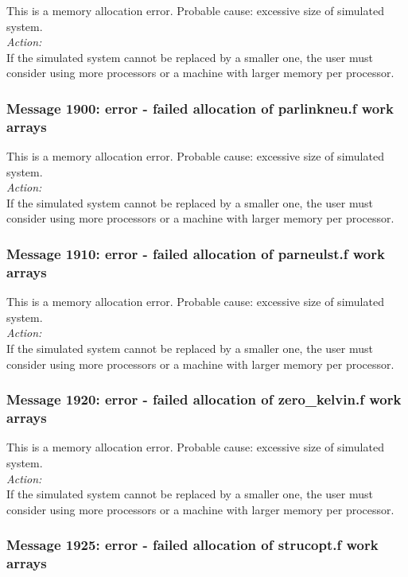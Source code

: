 This is a memory allocation error. Probable cause: excessive size of
simulated system. \\

\noindent
{\em Action:}\\
If the simulated system cannot be replaced by a smaller one, the user
must consider using more processors or a machine with larger memory
per processor.

\subsubsection*{Message 1900: error - failed allocation of parlinkneu.f
work arrays}

This is a memory allocation error. Probable cause: excessive size of
simulated system. \\

\noindent
{\em Action:}\\
If the simulated system cannot be replaced by a smaller one, the user
must consider using more processors or a machine with larger memory
per processor.

\subsubsection*{Message 1910: error - failed allocation of parneulst.f
work arrays}

This is a memory allocation error. Probable cause: excessive size of
simulated system. \\

\noindent
{\em Action:}\\
If the simulated system cannot be replaced by a smaller one, the user
must consider using more processors or a machine with larger memory
per processor.

\subsubsection*{Message 1920: error - failed allocation of zero\_kelvin.f
work arrays}

This is a memory allocation error. Probable cause: excessive size of
simulated system. \\

\noindent
{\em Action:}\\
If the simulated system cannot be replaced by a smaller one, the user
must consider using more processors or a machine with larger memory
per processor.

\subsubsection*{Message 1925: error - failed allocation of strucopt.f
work arrays}

